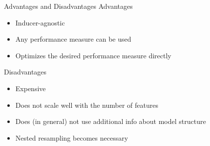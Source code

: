 \documentclass[11pt,compress,t,notes=noshow, xcolor=table]{beamer}
\begin{document}
\begin{frame}{Advantages and Disadvantages}
    Advantages
    \begin{itemize}
        \item Inducer-agnostic
        \item Any performance measure can be used
        \item Optimizes the desired performance measure directly
    \end{itemize}
    Disadvantages
    \begin{itemize}
        \item Expensive
        \item Does not scale well with the number of features
        \item Does (in general) not use additional info about model structure
        \item Nested resampling becomes necessary
    \end{itemize}
    
\end{frame}

\endlecture
\end{document}
